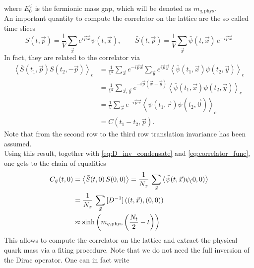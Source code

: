 where $E_0^{\psi}$ is the fermionic mass gap, which will be denoted as $m_{q,\text{phys}}$. \\
An important quantity to compute the correlator on the lattice are the so called time slices
\begin{equation*} 
    S(t, \vec{p})=\frac{1}{V} \sum_{\vec{x}} e^{i \vec{p} \vec{x}} \psi(t, \vec{x}), \qquad \bar{S}(t, \vec{p})=\frac{1}{V} \sum_{\vec{x}} \bar\psi(t, \vec{x}) \, e^{-i \vec{p} \vec{x}}
\end{equation*}
In fact, they are related to the correlator via
\begin{equation*}
    \begin{aligned}
        \left\langle \bar{S}\left(t_1, \vec{p}\right) S\left(t_2,-\vec{p}\right)\right\rangle_c & =\frac{1}{V^2} \sum_{\vec{x}} e^{-i \vec{p} \vec{x}} \sum_{\vec{y}} e^{i \vec{p} \vec{y}}\left\langle\bar\psi\left(t_1, \vec{x}\right) \psi\left(t_2, \vec{y}\right)\right\rangle_c \\
        & =\frac{1}{V^2} \sum_{\vec{x}, \vec{y}} e^{-i \vec{p}(\vec{x}-\vec{y})}\left\langle\bar\psi\left(t_1, \vec{x}\right) \psi\left(t_2, \vec{y}\right)\right\rangle_c \\
        & =\frac{1}{V} \sum_{\vec{r}} e^{-i \vec{p} \vec{r}}\left\langle\bar\psi\left(t_1, \vec{r}\right) \psi\left(t_2, \vec{0}\right)\right\rangle_c \\
        & =C\left(t_1-t_2, \vec{p}\right) .
        \end{aligned}
\end{equation*}
Note that from the second row to the third row translation invariance has been assumed. \\
Using this result, together with \eqref{eq:D_inv_condensate} and \eqref{eq:correlator_func}, one gets to the chain of equalities
\begin{equation*}
    \begin{aligned}
        C_\psi(t, 0)  &= \left\langle \bar{S}(t,0) \, S(0,0) \right\rangle = \frac{1}{N_x} \,  \sum_{\vec{x}} \left\langle \bar\psi(t,\vec{x}) \psi_(0,0) \right\rangle \\
        &= \frac{1}{N_x} \, \sum_{\vec{x}} \, [D^{-1}] \left((t,\vec{x}),(0,0)\right) \\
        &\approx \sinh\left(m_{q, \text{phys}}\left(\frac{N_t}{2} - t\right)\right)
    \end{aligned}
\end{equation*}
This allows to compute the correlator on the lattice and extract the physical quark mass via a fiting procedure. Note that we do not need the full inversion of the Dirac operator. One can in fact write 
